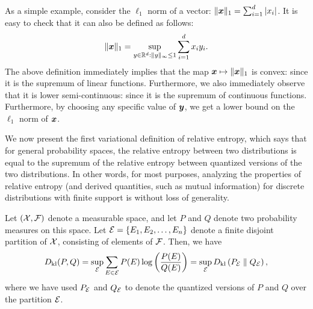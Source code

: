             \begin{example}
                \label{example:l1-norm}
                 As a simple example, consider the $\ell_1$ norm of a vector: $\|\boldsymbol{x}\|_1 = \sum_{i=1}^d |x_i|$. It is easy to check that it can also be defined as follows: 
                \begin{align}
                    \|\boldsymbol{x}\|_1 = \sup_{y \in \mathbb{R}^d: \|y\|_\infty \leq 1} \sum_{i=1}^d x_i y_i. 
                \end{align}
                The above definition immediately implies that the map $\boldsymbol{x} \mapsto \|\boldsymbol{x}\|_1$ is convex: since it is the supremum of linear functions. Furthermore, we also immediately observe that it is lower semi-continuous: since it is the supremum of continuous functions. Furthermore, by choosing any specific value of $\boldsymbol{y}$, we get a lower bound on the $\ell_1$ norm of $\boldsymbol{x}$.             
            \end{example}

            We now present the first variational definition of relative entropy, which says that for general probability spaces, the relative entropy between two distributions is equal to the supremum of the relative entropy between quantized versions of the two distributions. In other words, for most purposes, analyzing the properties of relative entropy (and derived quantities, such as mutual information) for discrete distributions with finite support is without loss of generality. 
        
            \begin{theorem}
                \label{thm:variational-rep-1}
                Let $(\mathcal{X}, \mathcal{F})$ denote a measurable space, and let $P$ and $Q$ denote two probability measures on this space. Let $\mathcal{E} = \{E_1, E_2, \ldots, E_n\}$ denote a finite disjoint partition of $\mathcal{X}$, consisting of elements of $\mathcal{F}$. Then, we have  
                \begin{align}
                    D_{\text{kl}}(P, Q) = \sup_{\mathcal{E}} \sum_{E \in \mathcal{E}} P(E) \log \left( \frac{P(E)}{Q(E)} \right) = \sup_{\mathcal{E}}  D_{\text{kl}} \left( P_{\mathcal{E}} \parallel Q_{\mathcal{E}} \right), 
                \end{align}
                where we have used $P_{\mathcal{E}}$ and $Q_{\mathcal{E}}$ to denote the quantized versions of $P$ and $Q$ over the partition $\mathcal{E}$. 
            \end{theorem}

